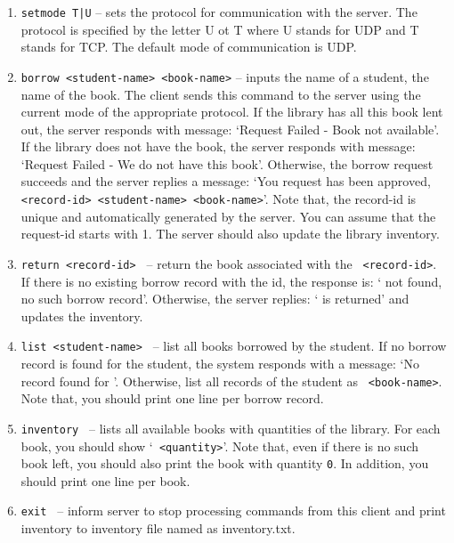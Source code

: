\documentclass[letter, 11pt] {article}
\begin{document}
\begin{enumerate}
  \begin{enumerate}
    \item {\tt setmode T|U} -- sets the protocol for communication with the server. The protocol is specified by
the letter U ot T where U stands for UDP and T stands for TCP. The default mode of communication is UDP.
    
    \item {\tt borrow <student-name> <book-name>} -- inputs
      the name of a student, the name of the book. The client sends this command
      to the server using the current mode of the appropriate protocol. 
      If the library has all this book lent out, the
      server responds with message: `Request Failed - Book not available'. If the
      library does not have the book, the server responds with message: `Request Failed 
      - We do not have this book'. Otherwise, the borrow request succeeds 
      and the server replies a message: `You request has been approved, {\tt
      <record-id> <student-name> <book-name>}'. Note that, the
      record-id is unique and automatically generated by the server. You can
      assume that the request-id starts with 1. The server should also update the
      library inventory.
    \item {\tt return <record-id> } -- return the book associated with the {\tt
      <record-id>}. If there is no existing borrow record with the id, the response is:
      `{\tt <record-id>} not found, no such borrow record'. Otherwise, the server
      replies: `{\tt <record-id>} is returned' and updates the inventory.
    \item {\tt list <student-name> } -- list all books borrowed by the student.  If
      no borrow record is found for the student, the system responds with a message: `No
      record found for {\tt <student-name>}'. Otherwise, list all records of the
      student as {\tt <record-id> <book-name>}. Note that, you
      should print one line per borrow record.
    \item {\tt inventory } -- lists all available books with quantities of
      the library. For each book, you should show `{\tt <book-name>
      <quantity>}'. Note that, even if there is no such book left, you should also
      print the book with quantity {\tt 0}. In addition, you should print
      one line per book.
     \item {\tt exit } -- inform server to stop processing commands from this client and print inventory to inventory file named as inventory.txt. 
  \end{enumerate}


\end{enumerate}
\end{document}
